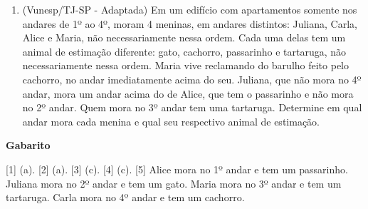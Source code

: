 \documentclass[12pt,a4paper]{article}
\begin{document}
\begin{enumerate}
        
    \item (Vunesp/TJ-SP - Adaptada) Em um edifício com apartamentos somente nos andares de 1º ao 4º, moram 4 meninas, 
    em andares distintos: Juliana, Carla, Alice e Maria, não necessariamente nessa ordem. 
    Cada uma delas tem um animal de estimação diferente: gato, cachorro, passarinho e tartaruga, 
    não necessariamente nessa ordem. Maria vive reclamando do barulho feito pelo cachorro, 
    no andar imediatamente acima do seu. Juliana, que não mora no 4º andar, mora um andar acima do de Alice, 
    que tem o passarinho e não mora no 2º andar. Quem mora no 3º andar tem uma tartaruga. 
    Determine em qual andar mora cada menina e qual seu respectivo animal de estimação.

\end{enumerate}

\begin{center}
  \textbf{Gabarito}
\end{center}

[1] (a). 
[2] (a).
[3] (c).
[4] (c). 
[5] 
Alice mora no 1º andar e tem um passarinho. 
Juliana mora no 2º andar e tem um gato. 
Maria mora no 3º andar e tem um tartaruga.  
Carla mora no 4º andar e tem um cachorro.
\end{document}
